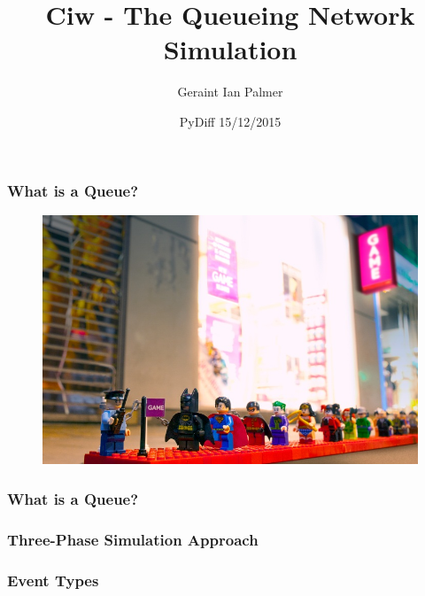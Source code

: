 \documentclass{beamer}
\title
{Ciw - The Queueing Network Simulation}
\author{Geraint Ian Palmer}
\date{PyDiff 15/12/2015}
\begin{document}
\frame{\titlepage}

\begin{frame}
\frametitle{What is a Queue?}
\begin{figure}
  
\end{figure}
\end{frame}

\begin{frame}
\begin{figure}
    \includegraphics[width=\textwidth]{legoqueue}
\end{figure}
\end{frame}

\begin{frame}
\frametitle{What is a Queue?}
\begin{figure}
  
\end{figure}
\end{frame}


\begin{frame}
\begin{figure}
    
\end{figure}
\end{frame}

\begin{frame}
\frametitle{Three-Phase Simulation Approach}
\begin{figure}
    
\end{figure}
\end{frame}

\begin{frame}
\frametitle{Event Types}
\begin{center}
\begin{figure}
    
\end{figure}
\end{center}
\end{frame}
\end{document}
